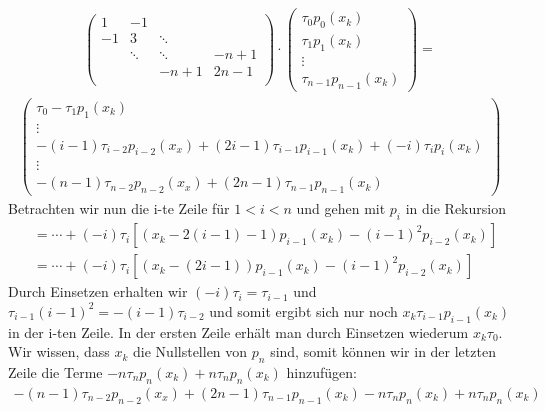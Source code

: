 \begin{align*}
\left(
\begin{array}{rrrr}                                
1 & -1 & & \\                                               
-1 & 3 &\ddots& \\                                               
&\ddots&\ddots& -n + 1 \\
& & -n + 1 & 2n - 1 \\
\end{array}
\right)
\cdot
\left(
\begin{array}{c}
    \tau_{0}p_{0}(x_{k})  \\
    \tau_{1}p_{1}(x_{k}) \\
    \vdots \\
    \tau_{n-1}p_{n-1}(x_{k})
\end{array}
\right) =
\end{align*}
\begin{align*}
\left(
\begin{array}{c}
    \tau_{0} - \tau_{1}p_{1}(x_{k}) \\
    \vdots \\
    -(i-1)\tau_{i-2}p_{i-2}(x_{x}) + (2i-1)\tau_{i-1}p_{i-1}(x_{k})+(-i)\tau_{i}p_{i}(x_{k}) \\
    \vdots \\
    -(n-1) \tau_{n-2}p_{n-2}(x_{x}) + (2n-1)\tau_{n-1}p_{n-1}(x_{k})
\end{array}
\right)
\end{align*}
Betrachten wir nun die i-te Zeile für $1 < i < n$ und gehen mit $p_{i}$ in die Rekursion \\
\begin{align*}
    &= \cdots + (-i)\tau_{i}[(x_{k}-2(i-1)-1)p_{i-1}(x_{k})-(i-1)^{2}p_{i-2}(x_{k})] \\
    &= \cdots + (-i)\tau_{i}[(x_{k}-(2i-1))p_{i-1}(x_{k})-(i-1)^{2}p_{i-2}(x_{k})]
\end{align*}
Durch Einsetzen erhalten wir $(-i)\tau_{i}=\tau_{i-1}$ und $\tau_{i-1}(i-1)^{2}= -(i-1)\tau_{i-2}$ und somit ergibt sich nur noch  $x_{k}\tau_{i-1}p_{i-1}(x_{k})$ in der i-ten Zeile. In der ersten Zeile erhält man durch Einsetzen wiederum $x_{k}\tau_{0}$. \\
Wir wissen, dass $x_{k}$ die Nullstellen von $p_{n}$ sind, somit können wir in der letzten Zeile die Terme $-n\tau_{n}p_{n}(x_{k})+n\tau_{n}p_{n}(x_{k})$ hinzufügen:
\begin{align*}
    -(n-1) \tau_{n-2}p_{n-2}(x_{x}) + (2n-1)\tau_{n-1}p_{n-1}(x_{k})-n\tau_{n}p_{n}(x_{k})+n\tau_{n}p_{n}(x_{k})
\end{align*}
